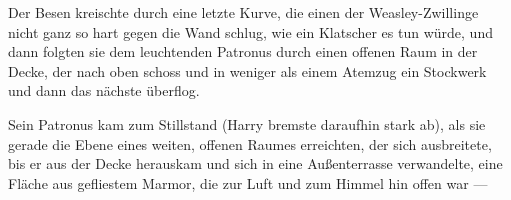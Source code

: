 Der Besen kreischte durch eine letzte Kurve, die einen der Weasley-Zwillinge nicht ganz so hart gegen die Wand schlug, wie ein Klatscher es tun würde, und dann folgten sie dem leuchtenden Patronus durch einen offenen Raum in der Decke, der nach oben schoss und in weniger als einem Atemzug ein Stockwerk und dann das nächste überflog.

Sein Patronus kam zum Stillstand (Harry bremste daraufhin stark ab), als sie gerade die Ebene eines weiten, offenen Raumes erreichten, der sich ausbreitete, bis er aus der Decke herauskam und sich in eine Außenterrasse verwandelte, eine Fläche aus gefliestem Marmor, die zur Luft und zum Himmel hin offen war —

